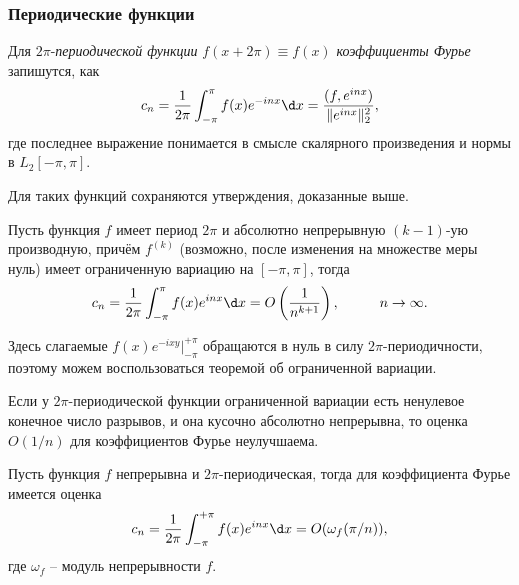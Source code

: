 \subsubsection*{Периодические функции}


\begin{to_def}
    Для $2\pi$-\textit{периодической функции}  $f(x+2\pi) \equiv f(x)$ \textit{коэффициенты Фурье}  запишутся, как
    \begin{equation*}
        c_n = \frac{1}{2\pi} \int_{-\pi}^{\pi} 
        f(x) e^{-inx} \d x = 
        \frac{
        (f, e^{inx})
        }{
        \|e^{inx}\|_2^2
        },
    \end{equation*}
    где последнее выражение понимается в смысле скалярного произведения и нормы в $L_2 [-\pi, \pi]$.
\end{to_def}

Для таких функций сохраняются утверждения, доказанные выше.

\begin{to_thr}[]
    Пусть функция $f$ имеет период $2 \pi$ и абсолютно непрерывную $(k-1)$-ую производную, причём $f^(k)$ (возможно, после изменения на множестве меры нуль) имеет ограниченную вариацию на $[-\pi, \pi]$, тогда
    \begin{equation*}
        c_n = \frac{1}{2\pi} \int_{-\pi}^{\pi} f(x) e^{inx} \d x =
        O\left(\frac{1}{n^{k+1}}\right),
        \hspace{1 cm}
        n \to \infty.
    \end{equation*}
\end{to_thr}


\begin{uproof}
Здесь слагаемые $f(x) e^{-ixy} |_{-\pi}^{+\pi}$ обращаются в нуль в силу $2\pi$-периодичности, поэтому можем воспользоваться теоремой об ограниченной вариации. 
\end{uproof}

\begin{to_lem}
    Если у $2\pi$-периодической функции ограниченной вариации есть ненулевое конечное число разрывов, и она кусочно абсолютно непрерывна, то оценка $O(1/n)$ для коэффициентов Фурье неулучшаема.
\end{to_lem}


\begin{to_thr}[]
    Пусть функция $f$ непрерывна и $2\pi$-периодическая, тогда для коэффициента Фурье имеется оценка
    \begin{equation*}
        c_n =
        \frac{1}{2\pi} \int_{-\pi}^{+\pi} f(x) e^{inx} \d x
        = O(\omega_f (\pi/n)),
    \end{equation*}
    где $\omega_f$ -- модуль непрерывности $f$.
\end{to_thr}


